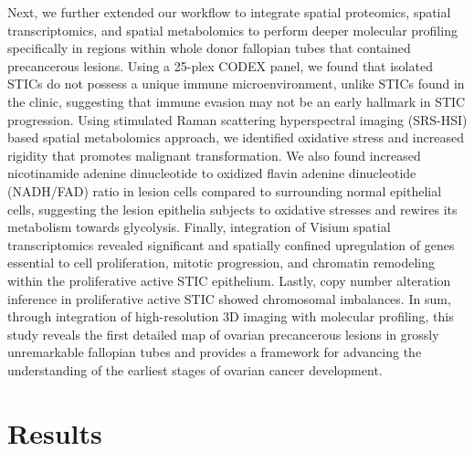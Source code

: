 \begin{refsection}
    Next, we further extended our workflow to integrate spatial proteomics, spatial transcriptomics, and spatial metabolomics to perform deeper molecular profiling specifically in regions within whole donor fallopian tubes that contained precancerous lesions. Using a 25-plex CODEX panel, we found that isolated STICs do not possess a unique immune microenvironment, unlike STICs found in the clinic, suggesting that immune evasion may not be an early hallmark in STIC progression. Using stimulated Raman scattering hyperspectral imaging (SRS-HSI) based spatial metabolomics approach\cite{Zhang2024Multi}, we identified oxidative stress and increased rigidity that promotes malignant transformation. We also found increased nicotinamide adenine dinucleotide to oxidized flavin adenine dinucleotide (NADH/FAD) ratio in lesion cells compared to surrounding normal epithelial cells, suggesting the lesion epithelia subjects to oxidative stresses and rewires its metabolism towards glycolysis. Finally, integration of Visium spatial transcriptomics revealed significant and spatially confined upregulation of genes essential to cell proliferation, mitotic progression, and chromatin remodeling within the proliferative active STIC epithelium. Lastly, copy number alteration inference in proliferative active STIC showed chromosomal imbalances\cite{Patel2014Single}. 
    In sum, through integration of high-resolution 3D imaging with molecular profiling, this study reveals the first detailed map of ovarian precancerous lesions in grossly unremarkable fallopian tubes and provides a framework for advancing the understanding of the earliest stages of ovarian cancer development.
    
    \section{Results}
    

\end{refsection}

